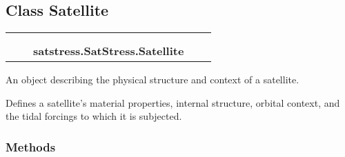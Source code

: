 
\subsection{Class Satellite}

    \label{satstress:SatStress:Satellite}
\begin{tabular}{cccccc}
\multicolumn{2}{r}{\settowidth{\BCL}{object}\multirow{2}{\BCL}{object}}
&&
  \\\cline{3-3}
  &&\multicolumn{1}{c|}{}
&&
  \\
&&\multicolumn{2}{l}{\textbf{satstress.SatStress.Satellite}}
\end{tabular}

An object describing the physical structure and context of a satellite.

Defines a satellite's material properties, internal structure, orbital 
context, and the tidal forcings to which it is subjected.



  \subsubsection{Methods}

    \vspace{0.5ex}

